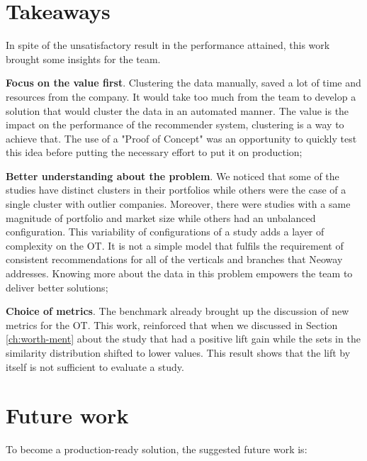 \section{Takeaways}

In spite of the unsatisfactory result in the performance attained, this work brought some insights for the team.

\textbf{Focus on the value first}. Clustering the data manually, saved a lot of time and resources from the company. It would take too much from the team to develop a solution that would cluster the data in an automated manner. The value is the impact on the performance of the recommender system, clustering is a way to achieve that. The use of a "Proof of Concept" was an opportunity to quickly test this idea before putting the necessary effort to put it on production;

\textbf{Better understanding about the problem}. We noticed that some of the studies have distinct clusters in their portfolios while others were the case of a single cluster with outlier companies. Moreover, there were studies with a same magnitude of portfolio and market size while others had an unbalanced configuration. This variability of configurations of a study adds a layer of complexity on the OT. It is not a simple model that fulfils the requirement of consistent recommendations for all of the verticals and branches that Neoway addresses. Knowing more about the data in this problem empowers the team to deliver better solutions;

\textbf{Choice of metrics}. The benchmark already brought up the discussion of new metrics for the OT. This work, reinforced that when we discussed in Section \ref{ch:worth-ment} about the study that had a positive lift gain while the sets in the similarity distribution shifted to lower values. This result shows that the lift by itself is not sufficient to evaluate a study.

\section*{Future work}

To become a production-ready solution, the suggested future work is:

